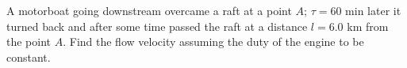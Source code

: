 
\item A motorboat going downstream overcame a raft at a point \( A \); \( \tau = 60 \) min later it turned back and after some time passed the raft at a distance \( l = 6.0 \) km from the point \( A \). Find the flow velocity assuming the duty of the engine to be constant.
